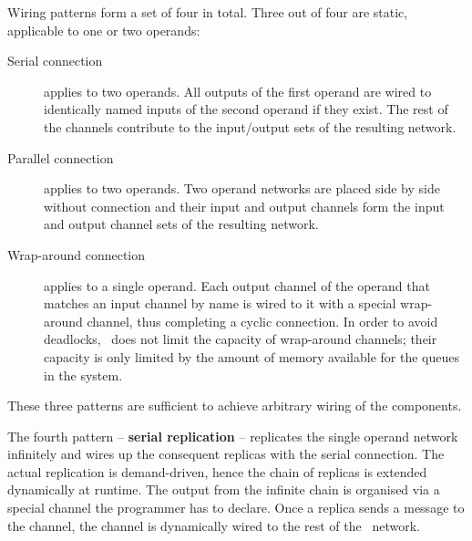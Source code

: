 Wiring patterns form a set of four in total. Three out of four are static, applicable to one or two operands:
\begin{description}
\item[Serial connection] applies to two operands. All outputs of the first operand are wired to identically named inputs of the second operand if they exist. The rest of the channels contribute to the input/output sets of the resulting network.

\item[Parallel connection] applies to two operands. Two operand networks are placed side by side without connection and their input and output channels form the input and output channel sets of the resulting network.

\item[Wrap-around connection] applies to a single operand. Each output channel of the operand that matches an input channel by name is wired to it with a special wrap-around channel, thus completing a cyclic connection. In order to avoid deadlocks, \ak\ does not limit the capacity of wrap-around channels; their capacity is only limited by the amount of memory available for the queues in the system.
\end{description}
These three patterns are sufficient to achieve arbitrary wiring of the components. %

The fourth pattern -- \textbf{serial replication} -- replicates the single operand network infinitely and wires up the consequent replicas with the serial connection. The actual replication is demand-driven, hence the chain of replicas is extended dynamically at runtime. The output from the infinite chain is organised via a special channel the programmer has to declare. Once a replica sends a message to the channel, the channel is dynamically wired to the rest of the \ak\ network.


